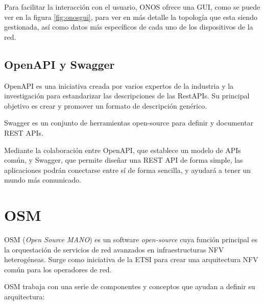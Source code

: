 Para facilitar la interacción con el usuario, ONOS ofrece una GUI, como se puede ver en la figura \ref{fig:onosgui}, para ver en más detalle la topología que esta siendo gestionada, así como datos más específicos de cada uno de los dispositivos de la red. 


\subsection{OpenAPI y Swagger}
\label{subsec:openapi}

OpenAPI\cite{openapibib} es una iniciativa creada por varios expertos de la industria y la investigación para estandarizar las descripciones de las RestAPIs. Su principal objetivo es crear y promover un formato de descripción genérico.

Swagger\cite{swaggerbib} es un conjunto de herramientas open-source para definir y documentar REST APIs.

Mediante la colaboración entre OpenAPI, que establece un modelo de APIs común, y Swagger, que permite diseñar una REST API de forma simple, las aplicaciones podrán conectarse entre sí de forma sencilla, y ayudará a tener un mundo más comunicado.

\section{OSM}
\label{sec:osm}

OSM (\textit{Open Source MANO}) es un software \textit{open-source} cuya función principal es la orquestación de servicios de red avanzados en infraestructuras NFV heterogéneas. Surge como iniciativa de la ETSI para crear una arquitectura NFV común para los operadores de red.

OSM trabaja con una serie de componentes y conceptos que ayudan a definir su arquitectura:

